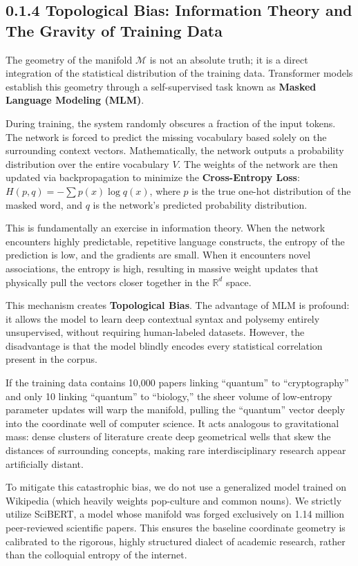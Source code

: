 \subsection*{0.1.4 Topological Bias: Information Theory and The Gravity of Training Data}

The geometry of the manifold $\mathcal{M}$ is not an absolute truth; it is a direct integration of the statistical distribution of the training data. Transformer models establish this geometry through a self-supervised task known as \textbf{Masked Language Modeling (MLM)}.

During training, the system randomly obscures a fraction of the input tokens. The network is forced to predict the missing vocabulary based solely on the surrounding context vectors. Mathematically, the network outputs a probability distribution over the entire vocabulary $V$. The weights of the network are then updated via backpropagation to minimize the \textbf{Cross-Entropy Loss}: $H(p, q) = -\sum p(x) \log q(x)$, where $p$ is the true one-hot distribution of the masked word, and $q$ is the network's predicted probability distribution.

This is fundamentally an exercise in information theory. When the network encounters highly predictable, repetitive language constructs, the entropy of the prediction is low, and the gradients are small. When it encounters novel associations, the entropy is high, resulting in massive weight updates that physically pull the vectors closer together in the $\mathbb{R}^d$ space.

This mechanism creates \textbf{Topological Bias}. The advantage of MLM is profound: it allows the model to learn deep contextual syntax and polysemy entirely unsupervised, without requiring human-labeled datasets. However, the disadvantage is that the model blindly encodes every statistical correlation present in the corpus.

If the training data contains 10,000 papers linking ``quantum'' to ``cryptography'' and only 10 linking ``quantum'' to ``biology,'' the sheer volume of low-entropy parameter updates will warp the manifold, pulling the ``quantum'' vector deeply into the coordinate well of computer science. It acts analogous to gravitational mass: dense clusters of literature create deep geometrical wells that skew the distances of surrounding concepts, making rare interdisciplinary research appear artificially distant.

To mitigate this catastrophic bias, we do not use a generalized model trained on Wikipedia (which heavily weights pop-culture and common nouns). We strictly utilize SciBERT, a model whose manifold was forged exclusively on 1.14 million peer-reviewed scientific papers. This ensures the baseline coordinate geometry is calibrated to the rigorous, highly structured dialect of academic research, rather than the colloquial entropy of the internet.


